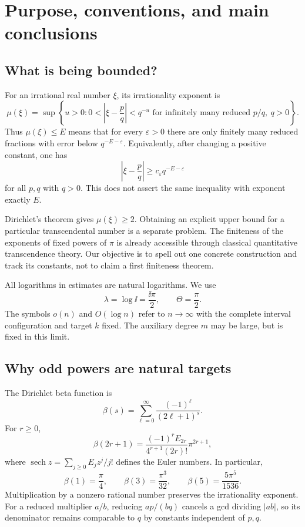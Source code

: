 \section{Purpose, conventions, and main conclusions}

\subsection{What is being bounded?}

For an irrational real number \(\xi\), its irrationality exponent is
\[
\mu(\xi)=\sup\left\{u>0:
0<\left|\xi-\frac pq\right|<q^{-u}
\text{ for infinitely many reduced }p/q,\ q>0\right\}.
\]
Thus \(\mu(\xi)\le E\) means that for every \(\varepsilon>0\) there are
only finitely many reduced fractions with error below
\(q^{-E-\varepsilon}\). Equivalently, after changing a positive
constant, one has
\begin{equation}\label{eq:measuremeaning}
\left|\xi-\frac pq\right|\ge c_\varepsilon q^{-E-\varepsilon}
\end{equation}
for all \(p,q\) with \(q>0\). This does not assert the same inequality
with exponent exactly \(E\).

Dirichlet's theorem gives \(\mu(\xi)\ge2\). Obtaining an explicit upper
bound for a particular transcendental number is a separate problem.
The finiteness of the exponents of fixed powers of \(\pi\) is already
accessible through classical quantitative transcendence theory.
Our objective is to spell out one concrete construction and track
its constants, not to claim a first finiteness theorem.

All logarithms in estimates are natural logarithms. We use
\[
\lambda=\log\ii=\frac{\ii\pi}{2},\qquad \Theta=\frac\pi2.
\]
The symbols \(o(n)\) and \(O(\log n)\) refer to \(n\to\infty\)
with the complete interval configuration and target \(k\) fixed.
The auxiliary degree \(m\) may be large, but is fixed in this limit.

\subsection{Why odd powers are natural targets}

The Dirichlet beta function is
\[
\beta(s)=\sum_{\ell=0}^{\infty}\frac{(-1)^\ell}{(2\ell+1)^s}.
\]
For \(r\ge0\),
\[
\beta(2r+1)=
\frac{(-1)^r E_{2r}}{4^{r+1}(2r)!}\pi^{2r+1},
\]
where \(\operatorname{sech}z=\sum_{j\ge0}E_jz^j/j!\) defines the
Euler numbers. In particular,
\[
\beta(1)=\frac\pi4,\qquad
\beta(3)=\frac{\pi^3}{32},\qquad
\beta(5)=\frac{5\pi^5}{1536}.
\]
Multiplication by a nonzero rational number preserves the irrationality
exponent. For a reduced multiplier \(a/b\), reducing \(ap/(bq)\)
cancels a gcd dividing \(|ab|\), so its denominator remains comparable
to \(q\) by constants independent of \(p,q\).

